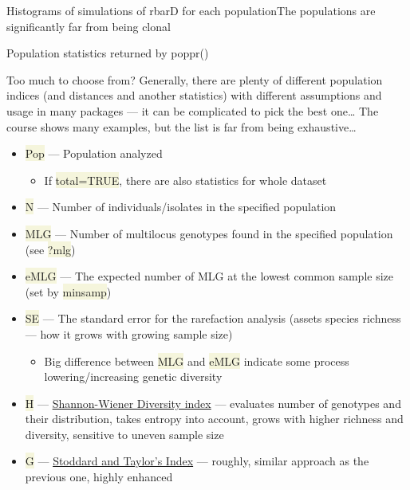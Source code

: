 \documentclass[compress, ucs, xelatex, 11pt, xcolor=svgnames, aspectratio=169,
	hyperref={
		bookmarks=true,
		unicode=true,
		colorlinks=true,
		pdftitle={Molecular data in R},
		plainpages=false,
		pdfauthor={Vojtech Zeisek},
		pdfsubject={Course about phylogeny and evolution in R},
		pdfcreator={XeLaTeX},
		pdfkeywords={R, evolution, phylogeny, molecular data},
		linkcolor=Crimson, %
		anchorcolor=Magenta, %
		citecolor=Magenta, %
		filecolor=Magenta, %
		menucolor=Magenta, %
		urlcolor=DodgerBlue, %
		pdftex},
	url={hyphens, lowtilde} %
	]{beamer}
\renewcommand{\texttt}[1]{\colorbox{Beige}{{\ttfamily #1}}}
\begin{document}
\begin{frame}{Histograms of simulations of rbarD for each population}{The populations are significantly far from being clonal}
	\begin{center}
		\texttt{[image: poppr.png]}
	\end{center}
\end{frame}

\begin{frame}[allowframebreaks]{Population statistics returned by poppr()}
	\begin{block}{Too much to choose from?}
		Generally, there are plenty of different population indices (and distances and another statistics) with different assumptions and usage in many packages --- it can be complicated to pick the best one\ldots{ }The course shows many examples, but the list is far from being exhaustive\ldots
	\end{block}
	\begin{itemize}
		\item \texttt{Pop} --- Population analyzed
		\begin{itemize}
			\item If \texttt{total=TRUE}, there are also statistics for whole dataset
		\end{itemize}
		\item \texttt{N} --- Number of individuals/isolates in the specified population
		\item \texttt{MLG} --- Number of multilocus genotypes found in the specified population (see \texttt{?mlg})
		\item \texttt{eMLG} --- The expected number of MLG at the lowest common sample size (set by \texttt{minsamp})
		\item \texttt{SE} --- The standard error for the rarefaction analysis (assets species richness --- how it grows with growing sample size)
		\begin{itemize}
			\item Big difference between \texttt{MLG} and \texttt{eMLG} indicate some process lowering/increasing genetic diversity
		\end{itemize}
		\item \texttt{H} --- \href{https://en.wikipedia.org/wiki/Diversity_index\#Shannon_index}{Shannon-Wiener Diversity index} --- evaluates number of genotypes and their distribution, takes entropy into account, grows with higher richness and diversity, sensitive to uneven sample size
		\item \texttt{G} --- \href{http://www.genetics.org/content/118/4/705}{Stoddard and Taylor's Index} --- roughly, similar approach as the previous one, highly enhanced

\end{itemize}
\end{frame}
\end{document}
